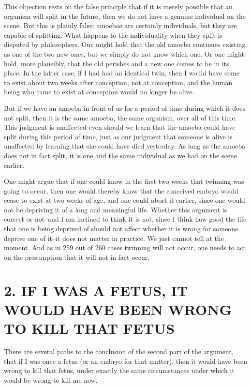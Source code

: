 This objection rests on the false principle that if it is merely possible 
that an organism will split in the future, then we do not have a genuine 
individual on the scene.  But this is plainly false: amoebae are certainly 
individuals,  but  they  are  capable  of  splitting.    What  happens  to  the 
individuality  when  they  split  is  disputed  by  philosophers.    One  might 
hold that the old amoeba continues existing as one of the two new ones, 
but  we  simply  do  not  know  which  one.    Or  one  might  hold,  more 
plausibly, that the old perishes and a new one comes to be in its place.  In 
the latter case, if I had had an identical twin, then I would have come to 
exist about two weeks after conception, not at conception, and the human 
being who came to exist at conception would no longer be alive. 

But if we have an amoeba  in front of us for a period of time during 
which it does not split, then it is the same amoeba, the same organism, 
over all of this time.  This judgment is unaffected even should we learn 
that the amoeba could have split during this period of time, just as our 
judgment that someone is alive is unaffected by learning that she could 
have died yesterday.  As long as the amoeba does not in fact split, it is 
one and the same individual as we had on the scene earlier. 

One might argue that if one could know in the first two weeks that 
twinning  was  going  to  occur,  then  one  would  thereby  know  that  the 
conceived  embryo  would  cease  to  exist  at  two  weeks  of  age,  and  one 
could abort it earlier, since one would not be depriving it of a long and 
meaningful  life.    Whether  this  argument  is  correct  or  not–and  I  am 
inclined to think it is not, since I think how good the life that one is being 
deprived of should not affect whether it is wrong for someone deprive 
one  of  it–it  does  not  matter  in  practice.    We  just  cannot  tell  at  the 
moment.  And as in 259 out of 260 cases twinning will not occur, one 
needs to act on the presumption that it will not in fact occur. 

\section{2. IF I WAS A FETUS, IT WOULD HAVE BEEN WRONG TO KILL THAT FETUS}

There  are  several  paths  to  the  conclusion  of  the  second  part  of  the 
argument, that if I was once a fetus (or an embryo for that matter), then it 
would  have  been  wrong  to  kill  that  fetus,  under  exactly  the  same 
circumstances under which it would be wrong to kill me now. 

